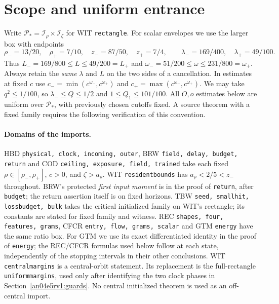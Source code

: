 \documentclass[11pt]{article}
\begin{document}
\section{Scope and uniform entrance}\label{an04e5rv1:uniformsources}
Write $\mathcal P_*=\mathcal I_\rho\times\mathcal I_\zeta$ for WIT \texttt{rectangle}. For scalar envelopes we use the larger box with endpoints
\[
 \rho_-=13/20,\quad \rho_+=7/10,\quad z_-=87/50,\quad z_+=7/4,\qquad
 \lambda_-=169/400,\quad\lambda_+=49/100 .
\]
Thus $L_-=169/800\le L\le49/200=L_+$ and
$\omega_-=51/200\le\omega\le231/800=\omega_+$. Always retain the \emph{same} $\lambda$ and $L$ on the two sides of a cancellation. In estimates at fixed $c$ use $c_-=\min(c^{\omega_-},c^{\omega_+})$ and $c_+=\max(c^{\omega_-},c^{\omega_+})$. We may take $q^2\le1/100$, so $\lambda_-\le Q\le1/2$ and $1\le Q_1\le101/100$. All $O,o$ estimates below are uniform over $\mathcal P_*$, with previously chosen cutoffs fixed. A source theorem with a fixed family requires the following verification of this convention.

\paragraph{Domains of the imports.}
HBD \texttt{physical, clock, incoming, outer}, BRW \texttt{field, delay, budget, return} and COD \texttt{ceiling, exposure, field, trained} take each fixed $\rho\in[\rho_-,\rho_+]$, $c>0$, and $\zeta>a_\rho$. WIT \texttt{residentbounds} has $a_\rho<2/5< z_-$ throughout. BRW's protected \emph{first input moment} is in the proof of \texttt{return}, after \texttt{budget}; the return assertion itself is on fixed horizons. TBW \texttt{seed, smallhit, lossbudget, bulk} takes the critical initialized family on WIT's rectangle; its constants are stated for fixed family and witness. REC \texttt{shapes, four, features, grams}, CFCR \texttt{entry, flow, grams, scalar} and GTM \texttt{energy} have the same ratio box. For GTM we use its exact differentiated identity in the proof of \texttt{energy}; the REC/CFCR formulas used below follow at each state, independently of the stopping intervals in their other conclusions. WIT \texttt{centralmargins} is a central-orbit statement. Its replacement is the full-rectangle \texttt{uniformmargins}, used only after identifying the two clock phases in Section~\ref{an04e5rv1:guards}. No central initialized theorem is used as an off-central import.
\end{document}
